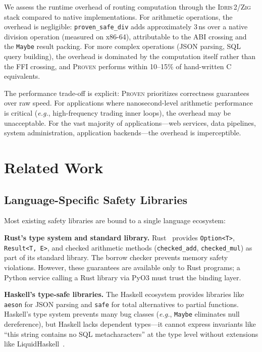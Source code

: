 \documentclass[11pt,a4paper]{article}
\newcommand{\proven}{\textsc{Proven}}
\newcommand{\idris}{\textsc{Idris\,2}}
\newcommand{\zig}{\textsc{Zig}}
\newcommand{\code}[1]{\texttt{#1}}
\newcommand{\eg}{\textit{e.g.}}
\begin{document}
We assess the runtime overhead of routing computation through the
\idris{}/\zig{} stack compared to native implementations. For
arithmetic operations, the overhead is negligible: \code{proven\_safe\_div}
adds approximately 3\,ns over a native division operation (measured on
x86-64), attributable to the ABI crossing and the \code{Maybe} result
packing. For more complex operations (JSON parsing, SQL query building),
the overhead is dominated by the computation itself rather than the FFI
crossing, and \proven{} performs within 10--15\% of hand-written C
equivalents.

The performance trade-off is explicit: \proven{} prioritizes correctness
guarantees over raw speed. For applications where nanosecond-level
arithmetic performance is critical (\eg, high-frequency trading inner
loops), the overhead may be unacceptable. For the vast majority of
applications---web services, data pipelines, system administration,
application backends---the overhead is imperceptible.


\section{Related Work}
\label{sec:related}

\subsection{Language-Specific Safety Libraries}

Most existing safety libraries are bound to a single language ecosystem:

\textbf{Rust's type system and standard library.} Rust~\cite{klabnik2023rust}
provides \code{Option<T>}, \code{Result<T, E>}, and checked arithmetic
methods (\code{checked\_add}, \code{checked\_mul}) as part of its standard
library. The borrow checker prevents memory safety violations. However,
these guarantees are available only to Rust programs; a Python service
calling a Rust library via PyO3 must trust the binding layer.

\textbf{Haskell's type-safe libraries.} The Haskell ecosystem provides
libraries like \code{aeson} for JSON parsing and \code{safe} for
total alternatives to partial functions. Haskell's type system prevents
many bug classes (\eg, \code{Maybe} eliminates null dereference), but
Haskell lacks dependent types---it cannot express invariants like
``this string contains no SQL metacharacters'' at the type level without
extensions like LiquidHaskell~\cite{vazou2014liquidhaskell}.
\end{document}
